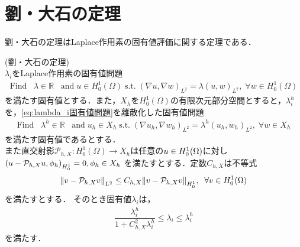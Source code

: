 \section{劉・大石の定理}
劉・大石の定理はLaplace作用素の固有値評価に関する定理である．
\begin{定理}  (劉・大石の定理)\\
  \(\lambda_i\)をLaplace作用素の固有値問題
  \begin{align}\label{eq:lambda_i固有値問題}
    \text{Find} \;\;\;\lambda \in \mathbb{R}\;\;\; \text{and} \;u\in H^1_0(\Omega)\;\text{s.t.}\;(\nabla u,\nabla w)_{L^2} = \lambda (u,w)_{L^2},\;\forall w \in H^1_0 (\Omega)
  \end{align}
  を満たす固有値とする．また，\(X_h\)を\(H^1_0(\Omega)\)の有限次元部分空間とすると，\(\lambda^h_i\)を，\eqref{eq:lambda_i固有値問題}を離散化した固有値問題
  \begin{align}\label{eq:lambda^h_i固有値問題}
    \text{Find} \;\;\;\lambda^h \in \mathbb{R}\;\;\; \text{and} \;u_h\in X_h \;\text{s.t.}\;(\nabla u_h,\nabla w_h)_{L^2} = \lambda^h (u_h,w_h)_{L^2},\;\forall w \in X_h
  \end{align}
  を満たす固有値であるとする．\\
  また直交射影\(\mathcal{P}_{h,X }:H^1_0(\Omega)\rightarrow X_h\)は任意の\(u\in H^1_0\qty(\Omega)\)に対し
  \(\qty(u-\mathcal{P}_{h,X }u , \phi_h)_{H^1_0} = 0,\phi_h\in X_h\)
  を満たすとする．定数\(C_{h,X }\)は不等式
  \begin{align}
    \norm{v-\mathcal{P}_{h,X }v}_{L^2} \leq C_{h,X} \norm{v-\mathcal{P}_{h,X }v}_{H^1_0},
    \;\;\forall v \in H^1_0(\Omega)
  \end{align}
  を満たすとする．
  そのとき固有値\(\lambda_i\)は，
  \begin{align}
    \dfrac{\lambda^h_i}{1+C_{h,X}^2\lambda^h_i} \leq \lambda_i \leq  \lambda^h_i
  \end{align}
  を満たす．
  
\end{定理}
